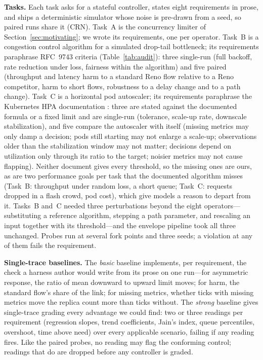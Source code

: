 \documentclass[sigconf,review,anonymous]{acmart}
\begin{document}
	\textbf{Tasks.} Each task asks for a stateful controller, states eight
	requirements in prose, and ships a deterministic simulator whose noise is
	pre-drawn from a seed, so paired runs share it (CRN). Task~A is the
	concurrency limiter of Section~\ref{sec:motivating}; we wrote its
	requirements, one per operator. Task~B is a congestion control algorithm
	for a simulated drop-tail bottleneck; its requirements paraphrase
	RFC~9743 criteria (Table~\ref{tab:audit}): three single-run (full backoff,
	rate reduction under loss, fairness within the algorithm) and five paired
	(throughput and latency harm to a standard Reno flow relative to a Reno
	competitor, harm to short flows, robustness to a delay change and to a
	path change). Task~C is a horizontal pod autoscaler; its requirements
	paraphrase the Kubernetes HPA documentation \cite{k8s-hpa}: three are
	stated against the documented formula or a fixed limit and are single-run
	(tolerance, scale-up rate, downscale stabilization), and five compare the
	autoscaler with itself (missing metrics may only damp a decision; pods
	still starting may not enlarge a scale-up; observations older than the
	stabilization window may not matter; decisions depend on utilization only
	through its ratio to the target; noisier metrics may not cause flapping).
	Neither document gives every threshold, so the missing ones are ours, as
	are two performance goals per task that the documented algorithm misses
	(Task~B: throughput under random loss, a short queue; Task~C: requests
	dropped in a flash crowd, pod cost), which give models a reason to depart
	from it. Tasks~B and~C needed three perturbations beyond the eight
	operators---substituting a reference algorithm, stepping a path
	parameter, and rescaling an input together with its threshold---and the
	envelope pipeline took all three unchanged. Probes run at several fork
	points and three seeds; a violation at any of them fails the requirement.

	\textbf{Single-trace baselines.} The \emph{basic} baseline implements,
	per requirement, the check a harness author would write from its prose
	on one run---for asymmetric response, the ratio of mean downward to
	upward limit moves; for harm, the standard flow's share of the link; for
	missing metrics, whether ticks with missing metrics move the replica
	count more than ticks without. The \emph{strong} baseline gives
	single-trace grading every advantage we could find: two or three
	readings per requirement (regression slopes, trend coefficients, Jain's
	index, queue percentiles, overshoot, time above need) over every
	applicable scenario, failing if any reading fires. Like the paired
	probes, no reading may flag the conforming control; readings that do are
	dropped before any controller is graded.
\end{document}
